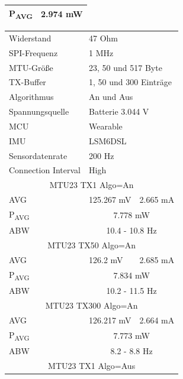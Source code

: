 \begin{figure}[!hbtp]
\begin{minipage}{0.5\textwidth}
\begin{tabular}{|l|l|l|}
      P\textsubscript{AVG} & \multicolumn{2}{c|}{2.974 mW}\\
      \hline
    \end{tabular}
    \label{tab:test1}
  \end{minipage}
  \begin{minipage}{0.5\textwidth}
    \centering
    \begin{tabular}{|l|l|l|}
      \hline
      Widerstand & \multicolumn{2}{l|}{47 Ohm}\\
      SPI-Frequenz & \multicolumn{2}{l|}{1 MHz}\\
      MTU-Größe & \multicolumn{2}{l|}{23, 50 und 517 Byte}\\
      TX-Buffer & \multicolumn{2}{l|}{1, 50 und 300 Einträge}\\
      Algorithmus & \multicolumn{2}{l|}{An und Aus}\\
      Spannungsquelle & \multicolumn{2}{l|}{Batterie 3.044 V}\\
      MCU & \multicolumn{2}{l|}{Wearable}\\
      IMU & \multicolumn{2}{l|}{LSM6DSL}\\
      Sensordatenrate & \multicolumn{2}{l|}{200 Hz}\\
      Connection Interval & \multicolumn{2}{l|}{High}\\
      \hline
      \multicolumn{3}{|c|}{MTU23 TX1 Algo=An}\\
      AVG & 125.267 mV & 2.665 mA\\
      P\textsubscript{AVG} & \multicolumn{2}{c|}{7.778 mW}\\
      ABW & \multicolumn{2}{c|}{10.4 - 10.8 Hz}\\
      \hline
      \multicolumn{3}{|c|}{MTU23 TX50 Algo=An}\\
      AVG & 126.2 mV & 2.685 mA\\
      P\textsubscript{AVG} & \multicolumn{2}{c|}{7.834 mW}\\
      ABW & \multicolumn{2}{c|}{10.2 - 11.5 Hz}\\
      \hline
      \multicolumn{3}{|c|}{MTU23 TX300 Algo=An}\\
      AVG & 126.217 mV & 2.664 mA\\
      P\textsubscript{AVG} & \multicolumn{2}{c|}{7.773 mW}\\
      ABW & \multicolumn{2}{c|}{8.2 - 8.8 Hz}\\
      \hline
      \multicolumn{3}{|c|}{MTU23 TX1 Algo=Aus}\\

\end{tabular}
\end{minipage}
\end{figure}
